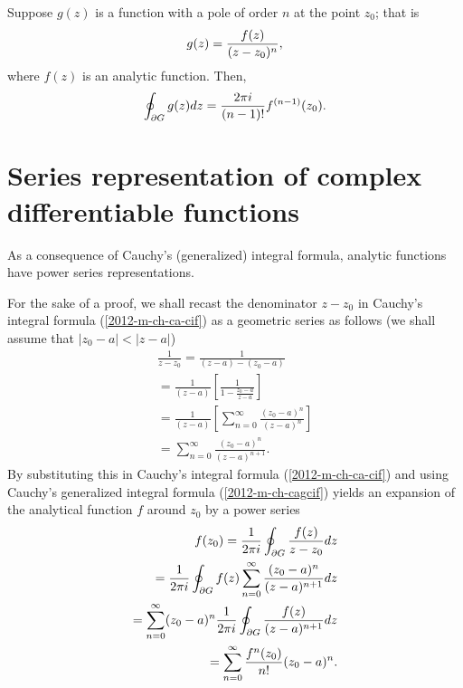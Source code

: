Suppose $g(z)$ is a function with a pole of order $n$ at the point
 $z_0$; that is
 \begin{equation}
g(z)= {f(z)\over (z-z_0)^n},
\end{equation}
 where $f(z)$ is an analytic function. Then,
 \begin{equation}
\oint_{\partial G}g(z)dz={2\pi i\over (n-1)!}f^{(n-1)}(z_0) .
\end{equation}

 \section{Series representation of complex differentiable functions}

As a consequence of Cauchy's (generalized) integral formula,
analytic functions have power series representations.

{\color{OliveGreen}
\bproof

For the sake of a proof,
we shall recast the denominator   $z-z_0$
in Cauchy's integral formula
(\ref{2012-m-ch-ca-cif})
as a geometric series as follows  (we shall assume that $|z_0 - a| < |z - a|$)
\begin{equation}
\begin{split}
\frac{1}{z - z_0}=
\frac{1}{(z - a) - (z_0 - a)}\\=
\frac{1}{ (z - a)} \left[\frac  {1}{1 - \frac{ z_0 - a }{ z - a }}\right]\\
=
\frac{1}{(z - a)} \left[ \sum_{n=0}^\infty \frac{ (z_0 - a)^n }{ (z - a)^n }\right]\\
=
 \sum_{n=0}^\infty \frac{ (z_0 - a)^n }{ (z - a)^{n+1} } .
\label{2012-m-ch-rgs}
\end{split}
\end{equation}
By substituting this in
Cauchy's integral formula
(\ref{2012-m-ch-ca-cif})
and using
Cauchy's generalized integral formula
(\ref{2012-m-ch-cagcif})
yields    an expansion of the analytical function $f$ around $z_0$ by a power series
\begin{equation}
\begin{split}
f(z_0)={1\over 2\pi i}\oint_{\partial G}{f(z)\over z-z_0}dz \\
={1\over 2\pi i}\oint_{\partial G} f(z) \sum_{n=0}^\infty \frac{ (z_0 - a)^n }{ (z - a)^{n+1}} dz \\
=  \sum_{n=0}^\infty (z_0 - a)^n  {1\over 2\pi i}\oint_{\partial G}  \frac{ f(z) }{ (z - a)^{n+1}} dz \\
=  \sum_{n=0}^\infty  \frac{ f^{n}(z_0) }{ n! }   (z_0 - a)^n  .
\end{split}
\label{2012-m-ch-ca-ssolut}
\end{equation}

\eproof
}


